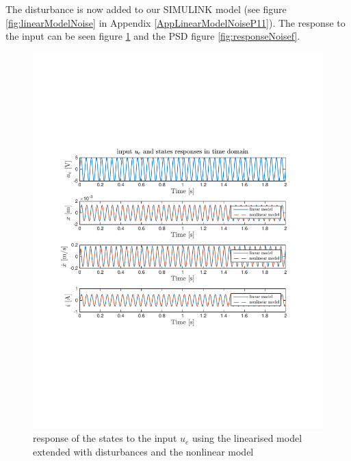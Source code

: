The disturbance is now added to our SIMULINK model (see figure \ref{fig:linearModelNoise} in Appendix \ref{AppLinearModelNoiseP11}). The response to the input can be seen figure \ref{fig:responseNoiset} and the PSD figure \ref{fig:responseNoisef}.

\begin{figure}[H]
 \centering 
 \includegraphics[trim=2cm 7cm 2cm 7cm, clip=true, totalheight=0.35\textheight, angle=0]{figures/p11time.pdf}
 \caption{response of the states to the input $u_e$ using the linearised model extended with disturbances and the nonlinear model}
 \label{fig:responseNoiset}
\end{figure}

